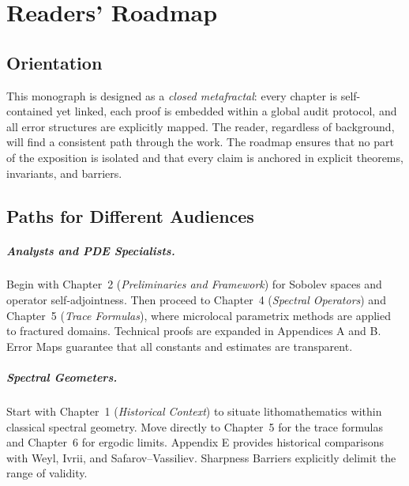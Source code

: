 
\chapter*{Readers' Roadmap}
\label{chap:readers-roadmap}

\section*{Orientation}

This monograph is designed as a \emph{closed metafractal}: every chapter is 
self-contained yet linked, each proof is embedded within a global audit 
protocol, and all error structures are explicitly mapped. The reader, regardless 
of background, will find a consistent path through the work. The roadmap 
ensures that no part of the exposition is isolated and that every claim is 
anchored in explicit theorems, invariants, and barriers.

\section*{Paths for Different Audiences}

\paragraph{Analysts and PDE Specialists.}
Begin with Chapter~2 (\emph{Preliminaries and Framework}) for Sobolev spaces 
and operator self-adjointness. Then proceed to Chapter~4 (\emph{Spectral 
Operators}) and Chapter~5 (\emph{Trace Formulas}), where microlocal parametrix 
methods are applied to fractured domains. Technical proofs are expanded in 
Appendices A and B. Error Maps guarantee that all constants and estimates are 
transparent.

\paragraph{Spectral Geometers.}
Start with Chapter~1 (\emph{Historical Context}) to situate lithomathematics 
within classical spectral geometry. Move directly to Chapter~5 for the trace 
formulas and Chapter~6 for ergodic limits. Appendix E provides historical 
comparisons with Weyl, Ivrii, and Safarov--Vassiliev. Sharpness Barriers 
explicitly delimit the range of validity.

